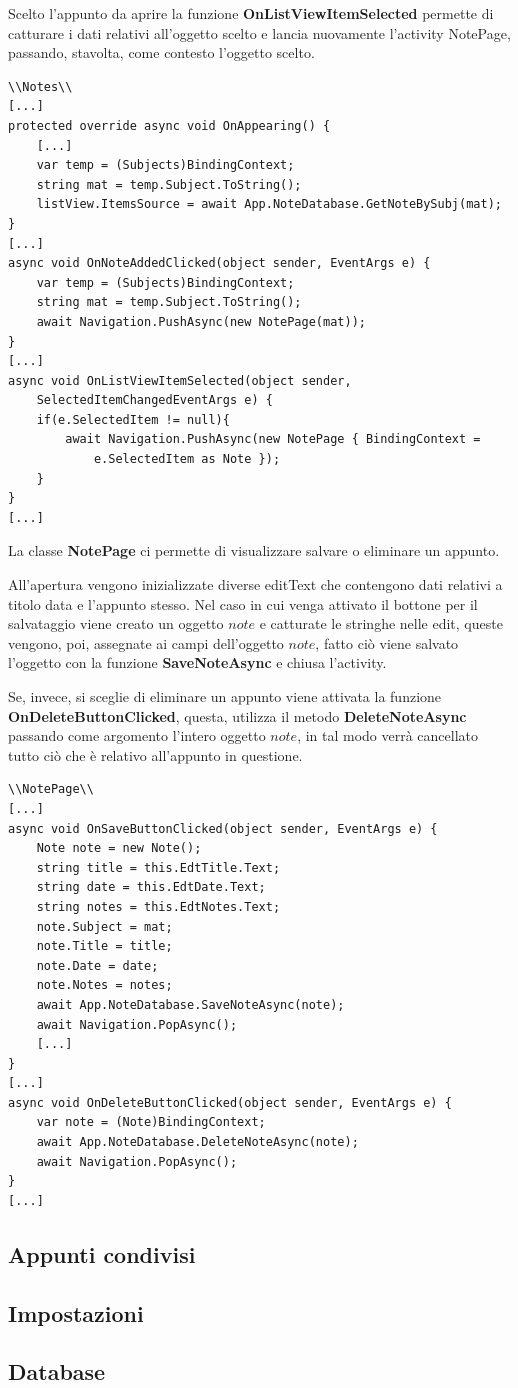 \documentclass[a4paper, 50pt, twoside]{article}
\begin{document}
Scelto l'appunto da aprire la funzione \textbf{OnListViewItemSelected} permette di catturare i dati relativi all'oggetto scelto e lancia nuovamente l'activity NotePage, passando, stavolta, come contesto l'oggetto scelto.

\begin{lstlisting}
\\Notes\\
[...]
protected override async void OnAppearing() {
	[...]
	var temp = (Subjects)BindingContext;
	string mat = temp.Subject.ToString();
	listView.ItemsSource = await App.NoteDatabase.GetNoteBySubj(mat);
}
[...]
async void OnNoteAddedClicked(object sender, EventArgs e) {
	var temp = (Subjects)BindingContext;
	string mat = temp.Subject.ToString();
	await Navigation.PushAsync(new NotePage(mat));
}
[...]
async void OnListViewItemSelected(object sender, 
	SelectedItemChangedEventArgs e) {
	if(e.SelectedItem != null){
		await Navigation.PushAsync(new NotePage { BindingContext =
			e.SelectedItem as Note });
	}
}
[...]
\end{lstlisting}

La classe \textbf{NotePage} ci permette di visualizzare salvare o eliminare un appunto.

All'apertura vengono inizializzate diverse editText che contengono dati relativi a titolo data e l'appunto stesso. Nel caso in cui venga attivato il bottone per il salvataggio viene creato un oggetto $note$ e catturate le stringhe nelle edit, queste vengono, poi, assegnate ai campi dell'oggetto $note$, fatto ciò viene salvato l'oggetto con la funzione \textbf{SaveNoteAsync} e chiusa l'activity.

Se, invece, si sceglie di eliminare un appunto viene attivata la funzione \textbf{OnDeleteButtonClicked}, questa, utilizza il metodo \textbf{DeleteNoteAsync} passando come argomento l'intero oggetto $note$, in tal modo verrà cancellato tutto ciò che è relativo all'appunto in questione.

\begin{lstlisting}
\\NotePage\\
[...]
async void OnSaveButtonClicked(object sender, EventArgs e) {
	Note note = new Note();
	string title = this.EdtTitle.Text;
	string date = this.EdtDate.Text;
	string notes = this.EdtNotes.Text;
	note.Subject = mat;
	note.Title = title;
	note.Date = date;
	note.Notes = notes;
	await App.NoteDatabase.SaveNoteAsync(note);
	await Navigation.PopAsync();
	[...]
}
[...]
async void OnDeleteButtonClicked(object sender, EventArgs e) {
	var note = (Note)BindingContext;
	await App.NoteDatabase.DeleteNoteAsync(note);
	await Navigation.PopAsync();
}
[...]
\end{lstlisting}
\subsection{Appunti condivisi}
\subsection{Impostazioni}
\subsection{Database}
\end{document}
